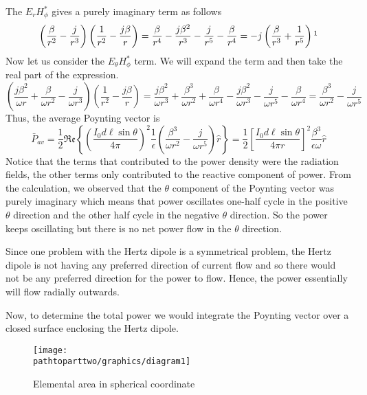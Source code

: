 The $E_rH_\phi^\ast$ gives a purely imaginary term as follows
\begin{dmath*}
\left(\dfrac{\beta}{r^2} - \frac{j}{r^3}\right)\left(\frac{1}{r^2} 
- \frac{j\beta}{r}\right)
=  \frac{\beta}{r^4} - \frac{j\beta^2}{r^3} 
- \frac{j}{r^5} - \frac{\beta}{r^4}
= -j\left( \frac{\beta}{r^3}  +  \frac{1}{r^5}\right)\footnotemark
\end{dmath*}
Now let us consider the $E_\theta H_\phi^\ast$ term. We will expand the term and then take the real part of the expression.
\begin{dmath*}
\left(\frac{j\beta^2}{\omega r} + \frac{\beta}{\omega r^2} - \frac{j}{\omega r^3}\right)\left(\frac{1}{r^2} - \frac{j\beta}{r}\right)
=\frac{j\beta^2}{\omega r^3} 
+ \frac{\beta^3}{\omega r^2} + \frac{\beta}{\omega r^4} 
- \frac{j\beta^2}{\omega r^3} - \frac{j}{\omega r^5}
- \frac{\beta}{\omega r^4}
=\frac{\beta^3}{\omega r^2} - \frac{j}{\omega r^5}
\end{dmath*}
Thus, the average Poynting vector is
\begin{dmath*}
\bar{P}_{av} = \frac{1}{2}\mathfrak{Re}\left\{\left(\frac{I_0 d\ell\sin\theta}{4\pi}\right)^2\frac{1}{\epsilon} \left(\frac{\beta^3}{\omega r^2} - \frac{j}{\omega r^5}\right)\hat{r}\right\}
= \frac{1}{2}
\left[\frac{I_0 d\ell\sin\theta}{4\pi r}\right]^2 \frac{\beta^3}{\epsilon\omega}\hat{r} 
\end{dmath*}
Notice that the terms that contributed to the power density were the radiation fields, the other terms only contributed to the reactive component of power. From the calculation, we observed that the $\theta$  component of the Poynting vector was purely imaginary which means that power oscillates one-half cycle in the positive $\theta$ direction and the other half cycle in the negative $\theta$ direction. So the power keeps oscillating but there is no net power flow in the $\theta$ direction.

Since one problem with the Hertz dipole is a symmetrical problem, the Hertz dipole is not having any preferred direction of current flow and so there would not be any preferred direction for the power to flow. Hence, the power essentially will flow radially outwards.

Now, to determine the total power we would integrate the Poynting vector over a closed surface enclosing the Hertz dipole.
\begin{figure}[h]
\centering
\texttt{[image: \\pathtoparttwo/graphics/diagram1]}
\caption{Elemental area in spherical coordinate}
\label{fig:diagram1}
\end{figure}

